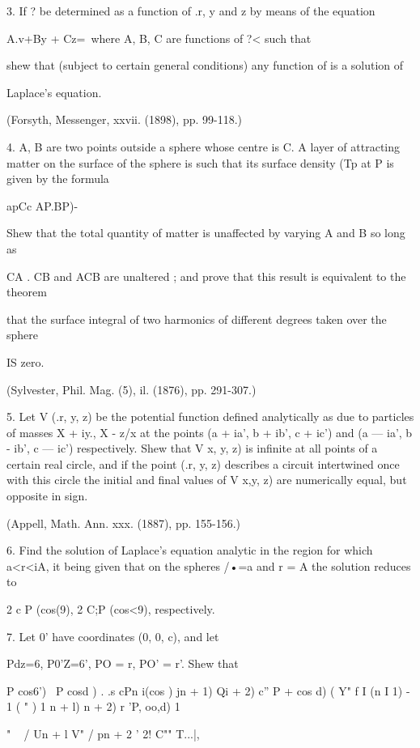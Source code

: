 3. If ?  be determined as a function of .r, y and z by means of the equation 

A.v+By + Cz=\, 
where A, B, C are functions of ?< such that 

shew that (subject to certain general conditions) any function of   is a solution of 

Laplace's equation. 

(Forsyth, Messenger, xxvii. (1898), pp. 99-118.) 

4. A, B are two points outside a sphere whose centre is C. A layer of attracting 
matter on the surface of the sphere is such that its surface density (Tp at P is given by 
the formula 

apCc AP.BP)-\ 

Shew that the total quantity of matter is unaffected by varying A and B so long as 

CA . CB and ACB are unaltered ; and prove that this result is equivalent to the theorem 

that the surface integral of two harmonics of different degrees taken over the sphere 

IS zero. 

(Sylvester, Phil. Mag. (5), il. (1876), pp. 291-307.) 

5. Let V (.r, y, z) be the potential function defined analytically as due to particles 
of masses X + iy., X - z/x at the points (a + ia', b + ib', c + ic') and (a — ia', b - ib', c — ic') 
respectively. Shew that V  x, y, z) is infinite at all points of a certain real circle, and 
if the point (.r, y, z) describes a circuit intertwined once with this circle the initial 
and final values of V x,y, z) are numerically equal, but opposite in sign. 

(Appell, Math. Ann. xxx. (1887), pp. 155-156.) 

6. Find the solution of Laplace's equation analytic in the region for which a<r<iA, 
it being given that on the spheres /•=a and r = A the solution reduces to 

2 c P (cos(9), 2 C;P (cos<9), 
respectively. 

7. Let 0' have coordinates (0, 0, c), and let 

Pdz=6, P0'Z=6', PO = r, PO' = r'. 
Shew that 

P  cos6') \  P  cosd ) . .s cPn i(cos ) jn + 1) Qi + 2) c'' P  +    cos d) 
( Y" f   I (n I 1) - 1 (  " ) 1  n + l) n + 2) r 'P, oo,d) 1 

"  ~  / Un + l V" / pn + 2 '  2! C""  T...|, 

